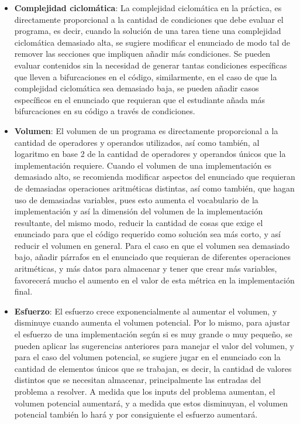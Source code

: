 \documentclass[letterpaper,12pt]{article}
\begin{document}
\begin{itemize}
  \item \textbf{Complejidad ciclomática}: La complejidad ciclomática en la práctica, es directamente proporcional a la cantidad de condiciones que debe evaluar el programa, es decir, cuando la solución de una tarea tiene una complejidad ciclomática demasiado alta, se sugiere modificar el enunciado de modo tal de remover las secciones que impliquen añadir más condiciones. Se pueden evaluar contenidos sin la necesidad de generar tantas condiciones específicas que lleven a bifurcaciones en el código, similarmente, en el caso de que la complejidad ciclomática sea demasiado baja, se pueden añadir casos específicos en el enunciado que requieran que el estudiante añada más bifurcaciones en su código a través de condiciones.
  \item \textbf{Volumen}: El volumen de un programa es directamente proporcional a la cantidad de operadores y operandos utilizados, así como también, al logaritmo en base 2 de la cantidad de operadores y operandos únicos que la implementación requiere. Cuando el volumen de una implementación es demasiado alto, se recomienda modificar aspectos del enunciado que requieran de demasiadas operaciones aritméticas distintas, así como también, que hagan uso de demasiadas variables, pues esto aumenta el vocabulario de la implementación y así la dimensión del volumen de la implementación resultante, del mismo modo, reducir la cantidad de cosas que exige el enunciado para que el código requerido como solución sea más corto, y así reducir el volumen en general. Para el caso en que el volumen sea demasiado bajo, añadir párrafos en el enunciado que requieran de diferentes operaciones aritméticas, y más datos para almacenar y tener que crear más variables, favorecerá mucho el aumento en el valor de esta métrica en la implementación final.
  \item \textbf{Esfuerzo}: El esfuerzo crece exponencialmente al aumentar el volumen, y disminuye cuando aumenta el volumen potencial. Por lo mismo, para ajustar el esfuerzo de una implementación según si es muy grande o muy pequeño, se pueden aplicar las sugerencias anteriores para manejar el valor del volumen, y para el caso del volumen potencial, se sugiere jugar en el enunciado con la cantidad de elementos únicos que se trabajan, es decir, la cantidad de valores distintos que se necesitan almacenar, principalmente las entradas del problema a resolver. A medida que los inputs del problema aumentan, el volumen potencial aumentará, y a medida que estos disminuyan, el volumen potencial también lo hará y por consiguiente el esfuerzo aumentará.

\end{itemize}
\end{document}

